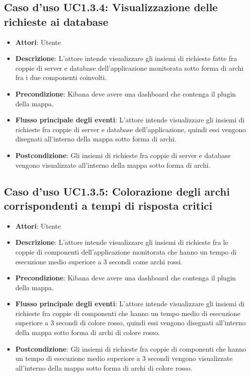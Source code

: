 \subsection{Caso d'uso UC1.3.4: Visualizzazione delle richieste ai database}
\begin{itemize}
	\item \textbf{Attori}: Utente
	\item \textbf{Descrizione}: L'attore intende visualizzare gli insiemi di richieste fatte fra coppie di server e database dell'applicazione monitorata sotto forma di archi fra i due componenti coinvolti.
	
	\item \textbf{Precondizione}: Kibana deve avere una dashboard che contenga il plugin della mappa.
	\item \textbf{Flusso principale degli eventi}: L'attore intende visualizzare gli insiemi di richieste fra coppie di server e database dell'applicazione, quindi essi vengono disegnati all'interno della mappa sotto forma di archi.
	\item \textbf{Postcondizione}: Gli insiemi di richieste fra coppie di server e database vengono visualizzate all'interno della mappa sotto forma di archi.
\end{itemize}
\subsection{Caso d'uso UC1.3.5: Colorazione degli archi corrispondenti a tempi di risposta critici}
\begin{itemize}
	\item \textbf{Attori}: Utente
	\item \textbf{Descrizione}: L'attore intende visualizzare gli insiemi di richieste fra le coppie di componenti dell'applicazione monitorata che hanno un tempo di esecuzione medio superiore a 3 secondi come archi rossi.
	
	\item \textbf{Precondizione}: Kibana deve avere una dashboard che contenga il plugin della mappa.
	\item \textbf{Flusso principale degli eventi}: L'attore intende visualizzare gli insiemi di richieste fra coppie di componenti che hanno un tempo medio di esecuzione superiore a 3 secondi di colore rosso, quindi essi vengono disegnati all'interno della mappa sotto forma di archi di colore rosso.
	\item \textbf{Postcondizione}: Gli insiemi di richieste fra coppie di componenti che hanno un tempo di esecuzione medio superiore a 3 secondi vengono visualizzate all'interno della mappa sotto forma di archi di colore rosso.
\end{itemize}
